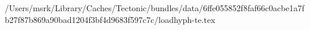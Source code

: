 /Users/msrk/Library/Caches/Tectonic/bundles/data/6ffe055852f8faf66c0acbe1a7fb27f87b869a90bad1204f3bf4d9683f597c7c/loadhyph-te.tex